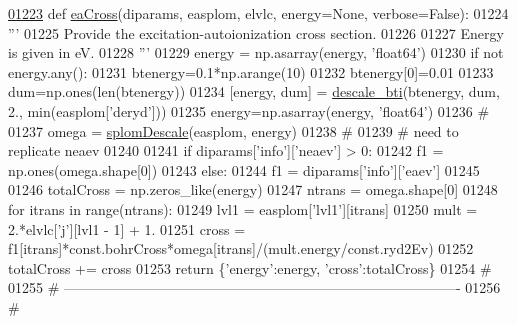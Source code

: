 \begin{DoxyCode}
\hypertarget{namespacepyneb_1_1utils_1_1__chianti__tools_l01223}{}\hyperlink{namespacepyneb_1_1utils_1_1__chianti__tools_a5c2be70e50273734d319a433bf39ce5b}{01223} \textcolor{keyword}{def }\hyperlink{namespacepyneb_1_1utils_1_1__chianti__tools_a5c2be70e50273734d319a433bf39ce5b}{eaCross}(diparams, easplom, elvlc, energy=None, verbose=False):
01224     \textcolor{stringliteral}{'''}
01225 \textcolor{stringliteral}{    Provide the excitation-autoionization cross section.}
01226 \textcolor{stringliteral}{}
01227 \textcolor{stringliteral}{    Energy is given in eV.}
01228 \textcolor{stringliteral}{    '''}
01229     energy = np.asarray(energy, \textcolor{stringliteral}{'float64'})
01230     \textcolor{keywordflow}{if} \textcolor{keywordflow}{not} energy.any():
01231         btenergy=0.1*np.arange(10)
01232         btenergy[0]=0.01
01233         dum=np.ones(len(btenergy))
01234         [energy, dum] = \hyperlink{namespacepyneb_1_1utils_1_1__chianti__tools_a47075ba90f01cbd7a3dbd08115544214}{descale\_bti}(btenergy, dum, 2., min(easplom[\textcolor{stringliteral}{'deryd'}]))
01235         energy=np.asarray(energy, \textcolor{stringliteral}{'float64'})
01236     \textcolor{comment}{#}
01237     omega = \hyperlink{namespacepyneb_1_1utils_1_1__chianti__tools_a391eb09a09769234e5759d5544d0bcaf}{splomDescale}(easplom, energy)
01238     \textcolor{comment}{#}
01239     \textcolor{comment}{#  need to replicate neaev}
01240 
01241     \textcolor{keywordflow}{if} diparams[\textcolor{stringliteral}{'info'}][\textcolor{stringliteral}{'neaev'}] > 0:
01242         f1 = np.ones(omega.shape[0])
01243     \textcolor{keywordflow}{else}:
01244         f1 = diparams[\textcolor{stringliteral}{'info'}][\textcolor{stringliteral}{'eaev'}]
01245 
01246     totalCross = np.zeros\_like(energy)
01247     ntrans = omega.shape[0]
01248     \textcolor{keywordflow}{for} itrans \textcolor{keywordflow}{in} range(ntrans):
01249         lvl1 = easplom[\textcolor{stringliteral}{'lvl1'}][itrans]
01250         mult = 2.*elvlc[\textcolor{stringliteral}{'j'}][lvl1 - 1] + 1.
01251         cross = f1[itrans]*const.bohrCross*omega[itrans]/(mult.energy/const.ryd2Ev)
01252         totalCross += cross
01253     \textcolor{keywordflow}{return} \{\textcolor{stringliteral}{'energy'}:energy, \textcolor{stringliteral}{'cross'}:totalCross\}
01254     \textcolor{comment}{#}
01255     \textcolor{comment}{# -------------------------------------------------------------------------------------}
01256     \textcolor{comment}{#}
\end{DoxyCode}
\hypertarget{namespacepyneb_1_1utils_1_1__chianti__tools_ab4f78a2584a1ddf189af644e961f0f83}{}
